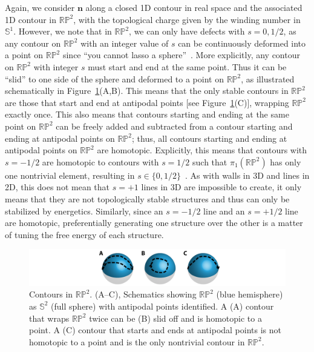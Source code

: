 Again, we consider $\mathbf{n}$ along a closed 1D contour in real space and the associated 1D contour in $\mathbb{R}\mathbb{P}^2$, with the topological charge given by the winding number in $\mathbb{S}^1$.
However, we note that in $\mathbb{R}\mathbb{P}^2$, we can only have defects with $s =0,1/2$, as any contour on $\mathbb{R}\mathbb{P}^2$ with an integer value of $s$ can be continuously deformed into a point on $\mathbb{R}\mathbb{P}^2$ since ``you cannot lasso a sphere''~\cite{RN153}.
More explicitly, any contour on  $\mathbb{R}\mathbb{P}^2$ with integer $s$ must start and end at the same point.
Thus it can be ``slid'' to one side of the sphere and deformed to a point on $\mathbb{R}\mathbb{P}^2$, as illustrated schematically in Figure~\ref{f:2-RP2}(A,B).
This means that the only stable contours in $\mathbb{R}\mathbb{P}^2$ are those that start and end at antipodal points [see Figure~\ref{f:2-RP2}(C)], wrapping $\mathbb{R}\mathbb{P}^2$ exactly once.
This also means that contours starting and ending at the same point on $\mathbb{R}\mathbb{P}^2$ can be freely added and subtracted from a contour starting and ending at antipodal points on $\mathbb{R}\mathbb{P}^2$; thus, all contours starting and ending at antipodal points on $\mathbb{R}\mathbb{P}^2$ are homotopic.
Explicitly, this means that contours with $s = -1/2$ are homotopic to contours with $s = 1/2$ such that $\pi_1(\mathbb{R}\mathbb{P}^2)$ has only one nontrivial element, resulting in $s \in \{ 0,1/2\}$~\cite{RN153}.
As with walls in 3D and lines in 2D, this does not mean that $s = +1$ lines in 3D are impossible to create, it only means that they are not topologically stable structures and thus can only be stabilized by energetics.
Similarly, since an $s = -1/2$ line and an $s = +1/2$ line are homotopic, preferentially generating one structure over the other is a matter of tuning the free energy of each structure.
\begin{figure}
  \centering
  \includegraphics{figures/C2/Ch2-Figs_RP2.png}
  \caption{Contours in $\mathbb{RP}^2$.
  (A--C), Schematics showing $\mathbb{RP}^2$ (blue hemisphere) as $\mathbb{S}^2$ (full sphere) with antipodal points identified.
  A (A) contour that wraps $\mathbb{RP}^2$ twice can be (B) slid off and is homotopic to a point.
  A (C) contour that starts and ends at antipodal points is not homotopic to a point and is the only nontrivial contour in $\mathbb{RP}^2$.}\label{f:2-RP2}
\end{figure}

